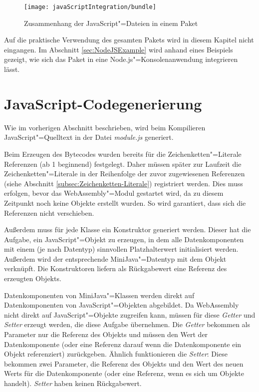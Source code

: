 \begin{figure}[]
    \centering
    \texttt{[image: javaScriptIntegration/bundle]}
    \caption{Zusammenhang der JavaScript"=Dateien in einem Paket}
    \label{fig:bundleStructure}
\end{figure}

Auf die praktische Verwendung des gesamten Pakets wird in diesem Kapitel nicht eingangen. Im Abschnitt \ref{sec:NodeJSExample} wird anhand eines Beispiels gezeigt, wie sich das Paket in eine Node.js"=Konsolenanwendung integrieren lässt.

\section{JavaScript-Codegenerierung}
\label{sec:JavaScript-Codegenerierung}

Wie im vorherigen Abschnitt beschrieben, wird beim Kompilieren JavaScript"=Quelltext in der Datei \emph{module.js} generiert.

Beim Erzeugen des Bytecodes wurden bereits für die Zeichenketten"=Literale Referenzen (ab 1 beginnend) festgelegt. Daher müssen später zur Laufzeit die Zeichenketten"=Literale in der Reihenfolge der zuvor zugewiesenen Referenzen (siehe Abschnitt \ref{subsec:Zeichenketten-Literale}) registriert werden. Dies muss erfolgen, bevor das WebAssembly"=Modul gestartet wird, da zu diesem Zeitpunkt noch keine Objekte erstellt wurden. So wird garantiert, dass sich die Referenzen nicht verschieben.

Außerdem muss für jede Klasse ein Konstruktor generiert werden. Dieser hat die Aufgabe, ein JavaScript"=Objekt zu erzeugen, in dem alle Datenkomponenten mit einem (je nach Datentyp) sinnvollen Platzhalterwert initialisiert werden. Außerdem wird der entsprechende MiniJava"=Datentyp mit dem Objekt verknüpft. Die Konstruktoren liefern als Rückgabewert eine Referenz des erzeugten Objekts.

Datenkomponenten von MiniJava"=Klassen werden direkt auf Datenkomponenten von JavaScript"=Objekten abgebildet. Da WebAssembly nicht direkt auf JavaScript"=Objekte zugreifen kann, müssen für diese \emph{Getter} und \emph{Setter} erzeugt werden, die diese Aufgabe übernehmen. Die \emph{Getter} bekommen als Parameter nur die Referenz des Objekts und müssen den Wert der Datenkomponente (oder eine Referenz darauf wenn die Datenkomponente ein Objekt referenziert) zurückgeben. Ähnlich funktionieren die \emph{Setter}: Diese bekommen zwei Parameter, die Referenz des Objekts und den Wert des neuen Werts für die Datenkomponente (oder eine Referenz, wenn es sich um Objekte handelt). \emph{Setter} haben keinen Rückgabewert.

